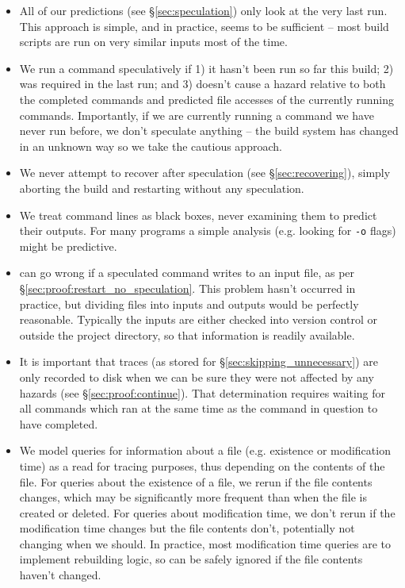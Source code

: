 \begin{itemize}
\item All of our predictions (see \S\ref{sec:speculation}) only look at the very last run. This approach is simple, and in practice, seems to be sufficient -- most build scripts are run on very similar inputs most of the time.
\item We run a command speculatively if 1) it hasn't been run so far this build; 2) was required in the last run; and 3) doesn't cause a hazard relative to both the completed commands and predicted file accesses of the currently running commands. Importantly, if we are currently running a command we have never run before, we don't speculate anything -- the build system has changed in an unknown way so we take the cautious approach.
\item We never attempt to recover after speculation (see \S\ref{sec:recovering}), simply aborting the build and restarting without any speculation.
\item We treat command lines as black boxes, never examining them to predict their outputs. For many programs a simple analysis (e.g. looking for \texttt{-o} flags) might be predictive.
\item \Rattle can go wrong if a speculated command writes to an input file, as per \S\ref{sec:proof:restart_no_speculation}. This problem hasn't occurred in practice, but dividing files into inputs and outputs would be perfectly reasonable. Typically the inputs are either checked into version control or outside the project directory, so that information is readily available.
\item It is important that traces (as stored for \S\ref{sec:skipping_unnecessary}) are only recorded to disk when we can be sure they were not affected by any hazards (see \S\ref{sec:proof:continue}). That determination requires waiting for all commands which ran at the same time as the command in question to have completed.
\item We model queries for information about a file (e.g. existence or modification time) as a read for tracing purposes, thus depending on the contents of the file. For queries about the existence of a file, we rerun if the file contents changes, which may be significantly more frequent than when the file is created or deleted. For queries about modification time, we don't rerun if the modification time changes but the file contents don't, potentially not changing when we should. In practice, most modification time queries are to implement rebuilding logic, so can be safely ignored if the file contents haven't changed.

\end{itemize}

